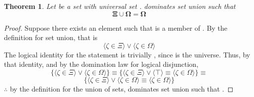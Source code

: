 \documentclass[preview]{standalone}
\newtheorem{theorem}{Theorem}
\begin{document}
\begin{theorem} %
    Let \bm{$\Xi$} be a set with universal set \bm{$\Omega$}. 
    \bm{$\Omega$} dominates set union such that 
    \begin{equation*}
        \bm{\Xi \cup \Omega = \Omega}    
    \end{equation*}
\end{theorem}
\begin{proof}
    Suppose there exists an element \bm{$\zeta$} such that \bm{$\zeta$} is a member of 
    \bm{$\Xi \cup \Omega$}. 
    By the definition for set union, that is
    \begin{equation*}
        \Big \langle \zeta \in \Xi \Big \rangle
            \lor 
        \Big \langle \zeta \in \Omega \Big \rangle
    \end{equation*}
    The logical identity for the statement \bm{$\zeta \in \Omega$} is trivially \bm{$\top$}, 
    since \bm{$\Omega$} is the universe. 
    Thus, 
    by that identity, 
    and by the domination law for logical disjunction,
    \begin{equation*}
        \Bigg\{
            \Big \langle \zeta \in \Xi \Big \rangle 
                \lor 
            \Big \langle \zeta \in \Omega \Big \rangle
        \Bigg\}
            \equiv
        \Bigg\{
            \Big \langle \zeta \in \Xi \Big \rangle 
                \lor 
            \Big \langle \top \Big \rangle
                \equiv
            \Big \langle \zeta \in \Omega \Big \rangle
        \Bigg\}
            \equiv
    \end{equation*}
    \begin{equation*}
        \Bigg\{
            \Big \langle \zeta \in \Xi \Big \rangle 
                \lor 
            \Big \langle \zeta \in \Omega \Big \rangle
                \equiv
            \Big \langle \zeta \in \Omega \Big \rangle
        \Bigg\}
    \end{equation*}
    $\therefore$ by the definition for the union of sets, 
    \bm{$\Omega$} dominates set union such that 
    \bm{$\Xi \cup \Omega = \Omega$}.
\end{proof}
\end{document}
